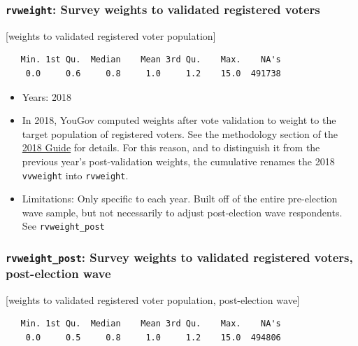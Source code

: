 \documentclass[10pt,article,oneside]{memoir}
\theoremstyle{definition}
\begin{document}
\hypertarget{rvweight-survey-weights-to-validated-registered-voters}{%
\subsubsection{\texorpdfstring{\texttt{rvweight}: Survey weights to
validated registered
voters}{rvweight: Survey weights to validated registered voters}}\label{rvweight-survey-weights-to-validated-registered-voters}}

{[}weights to validated registered voter population{]}

\begin{verbatim}
   Min. 1st Qu.  Median    Mean 3rd Qu.    Max.    NA's 
    0.0     0.6     0.8     1.0     1.2    15.0  491738 
\end{verbatim}

\begin{itemize}
\tightlist
\item
  Years: 2018
\item
  In 2018, YouGov computed weights after vote validation to weight to
  the target population of registered voters. See the methodology
  section of the \href{https://doi.org/10.7910/DVN/ZSBZ7K}{2018 Guide}
  for details. For this reason, and to distinguish it from the previous
  year's post-validation weights, the cumulative renames the 2018
  \texttt{vvweight} into \texttt{rvweight}.
\item
  Limitations: Only specific to each year. Built off of the entire
  pre-election wave sample, but not necessarily to adjust post-election
  wave respondents. See \texttt{rvweight\_post}
\end{itemize}

\hypertarget{rvweight_post-survey-weights-to-validated-registered-voters-post-election-wave}{%
\subsubsection{\texorpdfstring{\texttt{rvweight\_post}: Survey weights
to validated registered voters, post-election
wave}{rvweight\_post: Survey weights to validated registered voters, post-election wave}}\label{rvweight_post-survey-weights-to-validated-registered-voters-post-election-wave}}

{[}weights to validated registered voter population, post-election
wave{]}

\begin{verbatim}
   Min. 1st Qu.  Median    Mean 3rd Qu.    Max.    NA's 
    0.0     0.5     0.8     1.0     1.2    15.0  494806 
\end{verbatim}
\end{document}
